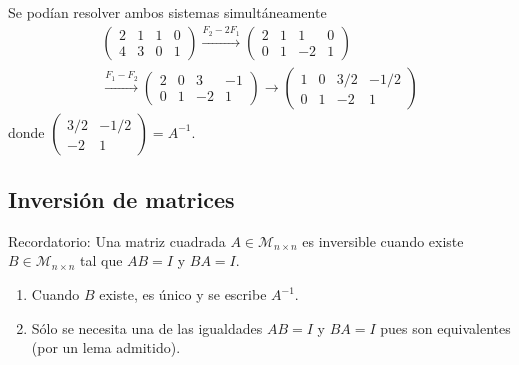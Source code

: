 \documentclass[11pt,a4paper]{article}
\newcommand{\M}{\mathcal{M}}
\begin{document}
\begin{ejemplo}
Se podían resolver ambos sistemas simultáneamente
\begin{multline*}
\left(\begin{array}{cc|cc}2&1&1&0\\4&3&0&1\end{array}\right)
\xrightarrow{F_2-2F_1}
\left(\begin{array}{cc|cc}2&1&1&0\\0&1&-2&1\end{array}\right)\\
\xrightarrow{F_1-F_2}
\left(\begin{array}{cc|cc}2&0&3&-1\\0&1&-2&1\end{array}\right)
\longrightarrow
\left(\begin{array}{cc|cc}1&0&3/2&-1/2\\0&1&-2&1\end{array}\right)
\end{multline*}
donde $\begin{pmatrix}3/2&-1/2\\-2&1\end{pmatrix}=A^{-1}$.
\end{ejemplo}


\subsection{Inversión de matrices}

Recordatorio: Una matriz cuadrada $A\in\M_{n\times n}$ es inversible cuando existe $B\in\M_{n\times n}$ tal que $AB=I$ y $BA=I$.

\begin{observacion}\leavevmode
\begin{enumerate}[label=\arabic*)]
  \item Cuando $B$ existe, es único y se escribe $A^{-1}$.
  \item Sólo se necesita una de las igualdades $AB=I$ y $BA=I$ pues son equivalentes (por un lema admitido).
\end{enumerate}
\end{observacion}
\end{document}
